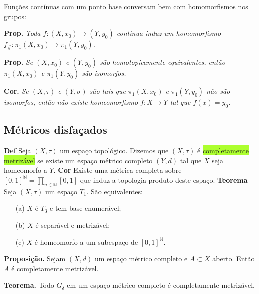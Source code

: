 \documentclass{article}
\begin{document}
\begin{landscape}
\begin{multicols}{3}
\medskip

\color{blue!70}Funções contínuas com um ponto base conversam bem com homomorfismos nos grupos:\color{black}

\medskip

\textbf{Prop.} \textit{Toda $f : (X, x_0) \rightarrow (Y, y_0)$ contínua induz um homomorfismo $f_{\#} : \pi_1(X, x_0) \rightarrow \pi_1(Y, y_0)$.}

\medskip

\textbf{Prop.} \textit{Se $(X, x_0)$ e $(Y, y_0)$ são homotopicamente equivalentes, então $\pi_1(X, x_0)$ e $\pi_1(Y, y_0)$ são isomorfos.}

\medskip
\textbf{Cor.} \textit{Se $(X, \tau)$ e $(Y, \sigma)$ são tais que $\pi_1(X, x_0)$ e $\pi_1(Y, y_0)$ não são isomorfos, então não existe homeomorfismo $f : X \rightarrow Y$ tal que $f(x) = y_0$.}
\end{multicols}
\begin{center}
    
 \section{Métricos disfaçados}
\end{center}
 
\begin{multicols}{3}
    
\textbf{Def}  Seja \((X,\tau)\) um espaço topológico. Dizemos que \((X,\tau)\) é \colorbox{GreenYellow}{completamente metrizável} se existe um espaço métrico completo \((Y,d)\) tal que \(X\) seja homeomorfo a \(Y\).
\medskip
\textbf{Cor } Existe uma métrica completa sobre \([0,1]^{\mathbb{N}} = \prod_{n\in\mathbb{N}}[0,1]\) que induz a topologia produto deste espaço.
\medskip
\textbf{Teorema} Seja \((X,\tau)\) um espaço \(T_1\). São equivalentes:
\begin{itemize}
  \item[(a)] \(X\) é \(T_3\) e tem base enumerável;
  \item[(b)] \(X\) é separável e metrizável;
  \item[(c)] \(X\) é homeomorfo a um subespaço de \([0,1]^{\mathbb{N}}\).
\end{itemize}

\medskip

\textbf{Proposição.} Sejam \((X,d)\) um espaço métrico completo e \(A\subset X\) aberto. Então \(A\) é completamente metrizável.

\medskip

\textbf{Teorema.} Todo \(G_\delta\) em um espaço métrico completo é completamente metrizável.


\end{multicols}
\end{landscape}
\end{document}

